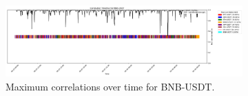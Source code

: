 \documentclass[11pt]{article}
\begin{document}
\begin{figure}[p]
    \vspace{0.1cm}

    \begin{subfigure}{\linewidth}
        \centering
        \includegraphics[width=\linewidth]{../assets/correlations/BNB-USDT.png}
        \caption{Maximum correlations over time for BNB-USDT.}
        \label{fig:bnb-corr}
    \end{subfigure}
    \caption{}
    \label{fig:correlations1}
\end{figure}
\end{document}
